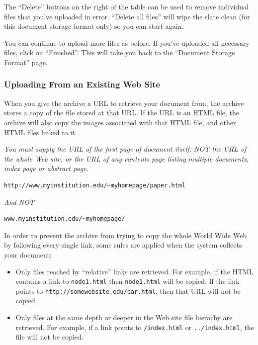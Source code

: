 The ``Delete'' buttons on the right of the table can be used to remove individual files that you've uploaded in error. ``Delete all files'' will wipe the slate clean (for this document storage format only) so you can start again.

You can continue to upload more files as before. If you've uploaded all necessary files, click on ``Finished''. This will take you back to the ``Document Storage Format'' page.


\subsubsection{Uploading From an Existing Web Site}

When you give the archive a URL to retrieve your document from, the archive stores a copy of the file stored at that URL. If the URL is an HTML file, the archive will also copy the images associated with that HTML file, and other HTML files linked to it.

\emph{You must supply the URL of the first page of document itself: NOT the URL of the whole Web site, or the URL of any contents page listing multiple documents, index page or abstract page.}

\begin{verbatim}
http://www.myinstitution.edu/~myhomepage/paper.html
\end{verbatim}

\emph{And NOT}

\begin{verbatim}
www.myinstitution.edu/~myhomepage/
\end{verbatim}

In order to prevent the archive from trying to copy the whole World Wide Web by following every single link, some rules are applied when the system collects your document:

\begin{itemize}
\item Only files reached by ``relative'' links are retrieved. For example, if the HTML contains a link to {\tt node1.html} then {\tt node1.html} will be copied. If the link points to {\tt http://somewebsite.edu/bar.html}, then that URL will not be copied.
\item Only files at the same depth or deeper in the Web site file hierachy are retrieved. For example, if a link points to {\tt /index.html} or {\tt ../index.html}, the file will not be copied.
\end{itemize}

